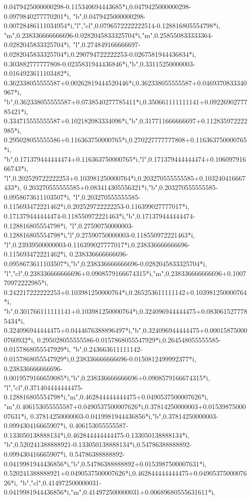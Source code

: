 \documentclass[border=5pt]{standalone}%
\begin{document}
\begin{luacode*}
{0.0479425000000298-0.115340694443685*i,0.0479425000000298-0.0979840277770201*i,
"b",0.0479425000000298-0.00728486111034954*i,"l","cl",0.0796572222222514-0.128816805554798*i,
"m",0.238336666666696-0.0282045833325704*i,"m",0.258550833333364-0.0282045833325704*i,
"l",0.274849166666697-0.0282045833325704*i,0.290794722222253-0.0267581944436834*i,
0.303882777777808-0.0235831944436846*i,"b",0.33115250000003-0.0164923611103482*i,
0.362338055555587+0.00262819444520446*i,0.362338055555587+0.0469370833340967*i,
"b",0.362338055555587+0.0738540277785411*i,0.350661111111141+0.0922690277785421*i,
0.334715555555587+0.102182083334096*i,"b",0.317711666666697+0.112835972222985*i,
0.295028055555586+0.116363750000765*i,0.270227777777808+0.116363750000765*i,
"b",0.171379444444474+0.116363750000765*i,"l",0.171379444444474+0.10609791666743*i,
"l",0.202529722222253+0.103981250000764*i,0.203270555555585+0.103240416667433*i,
0.203270555555585+0.083414305556321*i,"b",0.203270555555585-0.0958673611103507*i,
"l",0.203270555555585-0.115693472221462*i,0.202529722222253-0.116399027777017*i,
0.171379444444474-0.118550972221463*i,"b",0.171379444444474-0.128816805554798*i,
"l",0.27590750000003-0.128816805554798*i,"l",0.27590750000003-0.118550972221463*i,
"l",0.23939500000003-0.116399027777017*i,0.238336666666696-0.115693472221462*i,
0.238336666666696-0.0958673611103507*i,"b",0.238336666666696-0.0282045833325704*i,
"l","cl",0.238336666666696+0.0908579166674315*i,"m",0.238336666666696+0.100770972222985*i,
0.242217222222253+0.103981250000764*i,0.265253611111142+0.103981250000764*i,
"b",0.301766111111141+0.103981250000764*i,0.324096944444475+0.0830615277785434*i,
0.324096944444475+0.0444676388896497*i,"b",0.324096944444475+0.000158750000760932*i,
0.295028055555586-0.0157868055547929*i,0.264548055555585-0.0157868055547929*i,
"b",0.243663611111142-0.0157868055547929*i,0.238336666666696-0.0150812499992377*i,
0.238336666666696-0.0019579166659085*i,"b",0.238336666666696+0.0908579166674315*i,
"l","cl",0.371404444444475-0.128816805554798*i,"m",0.462844444444475+0.0490537500007626*i,
"m",0.406153055555587+0.0490537500007626*i,0.37814250000003+0.0153987500007631*i,
0.37814250000003-0.0419981944436856*i,"b",0.37814250000003-0.099430416665907*i,
0.406153055555587-0.133050138888134*i,0.462844444444475-0.133050138888134*i,
"b",0.520241388888921-0.133050138888134*i,0.54786388888892-0.099430416665907*i,
0.54786388888892-0.0419981944436856*i,"b",0.54786388888892+0.0153987500007631*i,
0.520241388888921+0.0490537500007626*i,0.462844444444475+0.0490537500007626*i,
"b","cl",0.414972500000031-0.0419981944436856*i,"m",0.414972500000031+0.00689680555631611*i,
}
\end{luacode*}
\end{document}
